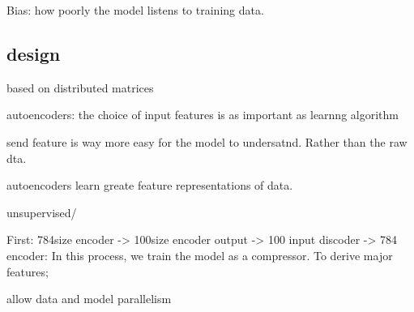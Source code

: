 \documentclass[12pt]{article}
\begin{document}
Bias: how poorly the model listens to training data.

\subsection{design}
based on distributed matrices

autoencoders: the choice of input features is as important as learnng algorithm

send feature is way more easy for the model to undersatnd. Rather than the raw dta.

autoencoders learn greate feature representations of data.

unsupervised/

First: 784size encoder -> 100size encoder output -> 100 input discoder -> 784 encoder:
In this process, we train the model as a compressor. To derive major features;

allow data and model parallelism
\end{document}
